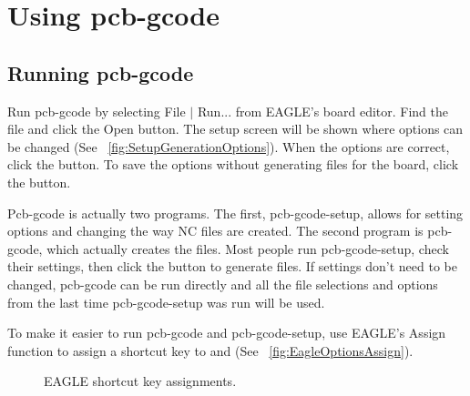 \documentclass[11pt]{book}
\begin{document}
%
\chapter{Using pcb-gcode}
%

%
%
\section{Running pcb-gcode}\label{sec:running}

Run pcb-gcode by selecting File $|$ Run... from EAGLE's board editor. Find the file  and click the Open button. The setup screen will be shown where options can be changed (See \figurename~\ref{fig:SetupGenerationOptions}). When the options are correct, click the  button. To save the options without generating files for the board, click the  button.

Pcb-gcode is actually two programs. The first, pcb-gcode-setup, allows for setting options and changing the way NC files are created. The second program is pcb-gcode, which actually creates the files. Most people run pcb-gcode-setup, check their settings, then click the  button to generate files. If settings don't need to be changed, pcb-gcode can be run directly and all the file selections and options from the last time pcb-gcode-setup was run will be used.

To make it easier to run pcb-gcode and pcb-gcode-setup, use EAGLE's Assign function to assign a shortcut key to  and  (See \figurename~\vref{fig:EagleOptionsAssign}).

\begin{figure}
	\caption{EAGLE shortcut key assignments.}
	\label{fig:EagleOptionsAssign}
\end{figure}
\end{document}
